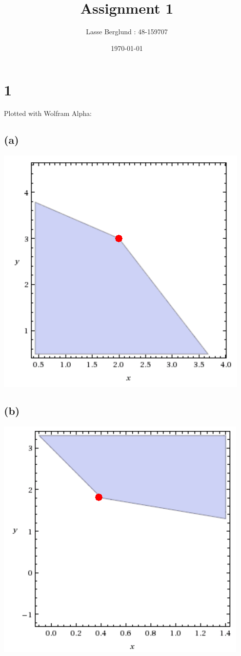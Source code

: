 \documentclass[12pt]{report}
\title{Assignment 1}
\author{Lasse Berglund : 48-159707}
\date{\today}
\begin{document}
\maketitle
\section*{1}
Plotted with Wolfram Alpha:

\subsection*{(a)}
\includegraphics[scale=0.35]{1_a.png}\\ 
\subsection*{(b)}
\includegraphics[scale=0.35]{1_b.png}
\end{document}

